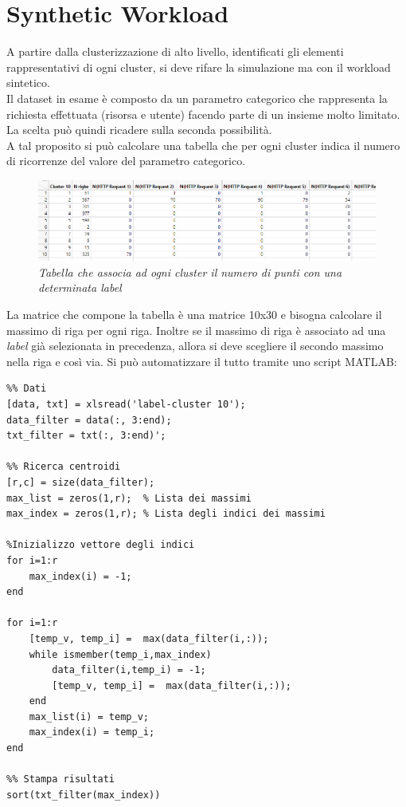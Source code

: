 \section{Synthetic Workload}
A partire dalla clusterizzazione di alto livello, identificati gli elementi rappresentativi di ogni cluster, si deve rifare la simulazione ma con il workload sintetico.
\\Il dataset in esame è composto da un parametro categorico che rappresenta la richiesta effettuata (risorsa e utente) facendo parte di un insieme molto limitato. La scelta può quindi ricadere sulla seconda possibilità.
\\A tal proposito si può calcolare una tabella che per ogni cluster indica il numero di ricorrenze del valore del parametro categorico.
\begin{figure}[H]
	\centering
	\includegraphics[width=\textwidth]{img/hw3/cluster_label.png}
	\caption{\textit{Tabella che associa ad ogni cluster il numero di punti con una determinata \textit{label}}}
\end{figure}
La matrice che compone la tabella è una matrice 10x30 e bisogna calcolare il massimo di riga per ogni riga. Inoltre se il massimo di riga è associato ad una \textit{label} già selezionata in precedenza, allora si deve scegliere il secondo massimo nella riga e così via. Si può automatizzare il tutto tramite uno script MATLAB:
\begin{verbatim}
%% Dati
[data, txt] = xlsread('label-cluster 10');
data_filter = data(:, 3:end); 
txt_filter = txt(:, 3:end)';

%% Ricerca centroidi
[r,c] = size(data_filter);
max_list = zeros(1,r);  % Lista dei massimi
max_index = zeros(1,r); % Lista degli indici dei massimi

%Inizializzo vettore degli indici
for i=1:r
	max_index(i) = -1;
end

for i=1:r
	[temp_v, temp_i] =  max(data_filter(i,:));
	while ismember(temp_i,max_index)
		data_filter(i,temp_i) = -1;
		[temp_v, temp_i] =  max(data_filter(i,:));
	end
	max_list(i) = temp_v;
	max_index(i) = temp_i;
end

%% Stampa risultati
sort(txt_filter(max_index))
\end{verbatim}
